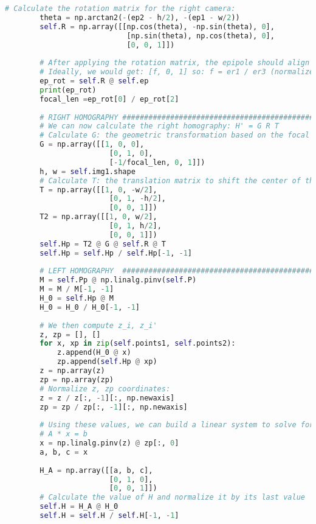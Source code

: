 \documentclass{article}
\begin{document}
\begin{lstlisting}[language=Python]
        # Calculate the rotation matrix for the right camera:
        theta = np.arctan2(-(ep2 - h/2), -(ep1 - w/2))
        self.R = np.array([[np.cos(theta), -np.sin(theta), 0],
                            [np.sin(theta), np.cos(theta), 0],
                            [0, 0, 1]])
        
        # After applying the rotation matrix, the epipole should align with the x_axis
        # Ideally, we would get: [f, 0, 1] so: f = er1 / er3 (normalize by third coord) and er2=0 ideally
        ep_rot = self.R @ self.ep
        print(ep_rot)
        focal_len =ep_rot[0] / ep_rot[2]
        
        # RIGHT HOMOGRAPHY #################################################
        # We can now calculate the right homography: H' = G R T
        # Calculate G: the geometric transformation based on the focal length
        G = np.array([[1, 0, 0],
                        [0, 1, 0],
                        [-1/focal_len, 0, 1]])
        h, w = self.img1.shape
        # Calculate T: the translation matrix to shift the center of the image
        T = np.array([[1, 0, -w/2],
                        [0, 1, -h/2],
                        [0, 0, 1]])
        T2 = np.array([[1, 0, w/2],
                        [0, 1, h/2],
                        [0, 0, 1]])
        self.Hp = T2 @ G @ self.R @ T
        self.Hp = self.Hp / self.Hp[-1, -1]
        
        # LEFT HOMOGRAPHY  #################################################
        M = self.Pp @ np.linalg.pinv(self.P)
        M = M / M[-1, -1]
        H_0 = self.Hp @ M
        H_0 = H_0 / H_0[-1, -1]
        
        # We then compute z_i, z_i'
        z, zp = [], []
        for x, xp in zip(self.points1, self.points2):
            z.append(H_0 @ x)
            zp.append(self.Hp @ xp)
        z = np.array(z)
        zp = np.array(zp)
        # Normalize z, zp coordinates:
        z = z / z[:, -1][:, np.newaxis]
        zp = zp / zp[:, -1][:, np.newaxis]
        
        # Using these values, we can build a linear system to solve for the left homography:
        # A * x = b
        x = np.linalg.pinv(z) @ zp[:, 0]
        a, b, c = x
        
        H_A = np.array([[a, b, c],
                        [0, 1, 0],
                        [0, 0, 1]])
        # Calculate the value of H and normalize it by its last value
        self.H = H_A @ H_0
        self.H = self.H / self.H[-1, -1]
        


\end{lstlisting}
\end{document}
